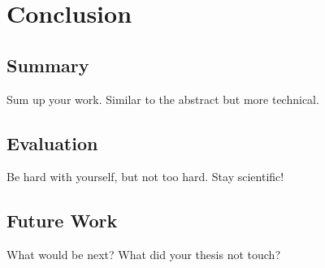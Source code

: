 \documentclass[thesis.tex]{subfiles}
\begin{document}
\chapter{Conclusion}\label{chap:concl}

\section{Summary}
Sum up your work. Similar to the abstract but more technical.

\section{Evaluation}
Be hard with yourself, but not too hard. Stay scientific!

\section{Future Work}
What would be next? What did your thesis not touch? \cite{Munchmeyer2020}

\subfilebib %
\end{document}
